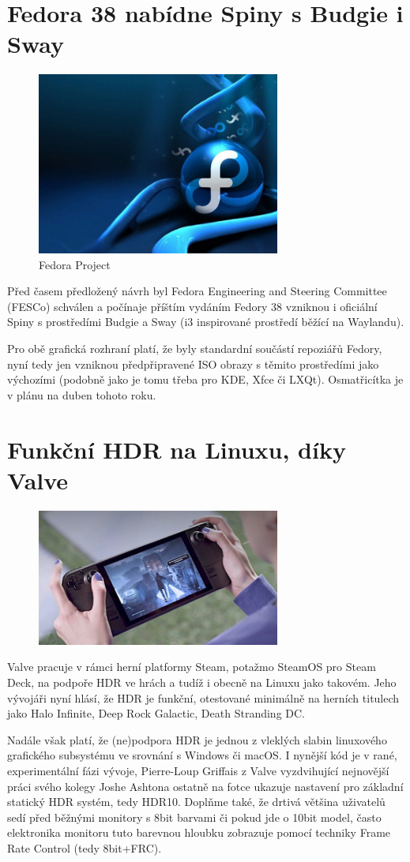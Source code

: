 \documentclass[a4paper,12pt]{report}
\begin{document}
\chapter{Fedora 38 nabídne Spiny s Budgie i Sway}
\begin{figure}[htp]
\centering
\includegraphics[width=8cm]{IKT_4_1_23@2.jpg}
\caption{Fedora Project}
\end{figure}
Před časem předložený návrh byl Fedora Engineering and Steering Committee (FESCo) schválen a počínaje příštím vydáním Fedory 38 vzniknou i oficiální Spiny s prostředími Budgie a Sway (i3 inspirované prostředí běžící na Waylandu).

Pro obě grafická rozhraní platí, že byly standardní součástí repoziářů Fedory, nyní tedy jen vzniknou předpřipravené ISO obrazy s těmito prostředími jako výchozími (podobně jako je tomu třeba pro KDE, Xfce či LXQt). Osmatřicítka je v plánu na duben tohoto roku.
\chapter{Funkční HDR na Linuxu, díky Valve}
\begin{figure}[htp]
\centering
\includegraphics[width=8cm]{IKT_4_1_23@4.jpg}
\end{figure}
Valve pracuje v rámci herní platformy Steam, potažmo SteamOS pro Steam Deck, na podpoře HDR ve hrách a tudíž i obecně na Linuxu jako takovém. Jeho vývojáři nyní hlásí, že HDR je funkční, otestované minimálně na herních titulech jako Halo Infinite, Deep Rock Galactic, Death Stranding DC.

Nadále však platí, že (ne)podpora HDR je jednou z vleklých slabin linuxového grafického subsystému ve srovnání s Windows či macOS. I nynější kód je v rané, experimentální fázi vývoje, Pierre-Loup Griffais z Valve vyzdvihující nejnovější práci svého kolegy Joshe Ashtona ostatně na fotce ukazuje nastavení pro základní statický HDR systém, tedy HDR10. Doplňme také, že drtivá většina uživatelů sedí před běžnými monitory s 8bit barvami či pokud jde o 10bit model, často elektronika monitoru tuto barevnou hloubku zobrazuje pomocí techniky Frame Rate Control (tedy 8bit+FRC).
\end{document}
